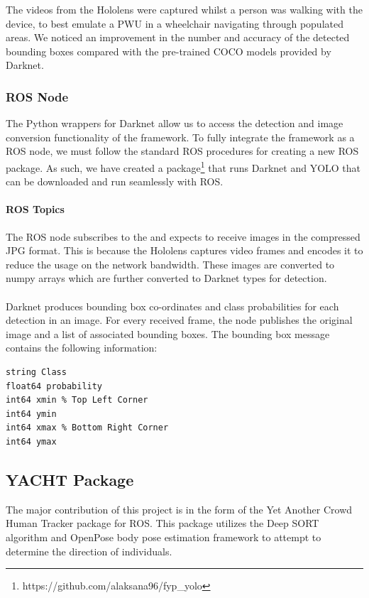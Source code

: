 The videos from the Hololens were captured whilst a person was walking with the device, to best emulate a PWU in a wheelchair navigating through populated areas. We noticed an improvement in the number and accuracy of the detected bounding boxes compared with the pre-trained COCO models provided by Darknet. 



\subsubsection{ROS Node} \label{sec:nodeYOLO}
The Python wrappers for Darknet allow us to access the detection and image conversion functionality of the framework. To fully integrate the framework as a ROS node, we must follow the standard ROS procedures for creating a new ROS package. As such, we have created a package\footnote{https://github.com/alaksana96/fyp\_yolo} that runs Darknet and YOLO that can be downloaded and run seamlessly with ROS.

\paragraph{ROS Topics} The ROS node subscribes to the  and expects to receive images in the compressed JPG format. This is because the Hololens captures video frames and encodes it to reduce the usage on the network bandwidth. These images are converted to numpy arrays which are further converted to Darknet  types for detection. 

\paragraph{} Darknet produces bounding box co-ordinates and class probabilities for each detection in an image. For every received frame, the node publishes the original image and a list of associated bounding boxes. The bounding box message contains the following information: \\

\begin{lstlisting}[language=Mymatlab,caption={BoundingBox.msg},label={bbmsg}]
string Class
float64 probability
int64 xmin % Top Left Corner
int64 ymin
int64 xmax % Bottom Right Corner
int64 ymax
\end{lstlisting}

\subsection{YACHT Package} \label{sec:YACHT}
The major contribution of this project is in the form of the Yet Another Crowd Human Tracker package for ROS. This package utilizes the Deep SORT algorithm and OpenPose body pose estimation framework to attempt to determine the direction of individuals.


